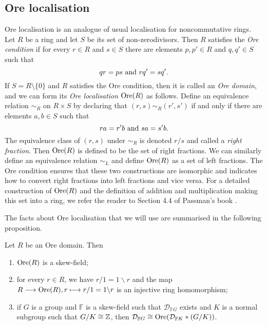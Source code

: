 \documentclass[11pt, letterpaper]{amsart}
\begin{document}
\subsection{Ore localisation}

Ore localisation is an analogue of usual localisation for noncommutative rings. Let $R$ be a ring and let $S$ be its set of non-zerodivisors. Then $R$ satisfies the \textit{Ore condition} if for every $r \in R$ and $s \in S$ there  are elements $p,p' \in R$ and $q,q' \in S$ such that 
\[
    qr = ps \ \textnormal{and} \ rq' = sq'.
\]
If  $S = R \setminus \{0\}$ and $R$ satisfies the Ore condition, then it is called an \textit{Ore domain}, and we can form its \textit{Ore localisation} $\operatorname{Ore}(R)$ as follows. Define an equivalence relation $\sim_R$ on $R \times S$ by declaring that $(r,s) \sim_R (r',s')$ if and only if there are elements $a,b \in S$ such that
\[
    ra = r'b \ \textnormal{and} \ sa = s'b.
\]
The equivalence class of $(r,s)$ under $\sim_R$ is denoted $r/s$ and called a \textit{right fraction}. Then $\operatorname{Ore}(R)$ is defined to be the set of right fractions. We can similarly define an equivalence relation $\sim_L$ and define $\operatorname{Ore}(R)$ as a set of left fractions. The Ore condition ensures that these two constructions are isomorphic and indicates how to convert right fractions into left fractions and vice versa. For a detailed construction of $\operatorname{Ore}(R)$ and the definition of addition and multiplication making this set into a ring, we refer the reader to Section 4.4 of Passman's book \cite{PassmanGrpRng}.

The facts about Ore localisation that we will use are summarised in the following proposition.

\begin{prop}\label{prop:OreLoc}
Let $R$ be an Ore domain. Then
\begin{enumerate}[label = (\arabic*)]
    \item $\operatorname{Ore}(R)$ is a skew-field;
    \item for every $r \in R$, we have $r / 1 = 1 \backslash r$ and the map $R \longrightarrow \operatorname{Ore}(R), r \longmapsto r/1 = 1 \backslash r$ is an injective ring homomorphism;
    \item \cite[Proposition 2.2(2)]{JaikinZapirain2020THEUO} if $G$ is a group and $\mathbb{F}$ is a skew-field such that $\mathcal{D}_{\mathbb{F}G}$ exists and $K$ is a normal subgroup such that $G / K \cong \mathbb{Z}$, then  $\mathcal{D}_{\mathbb{F}G} \cong \operatorname{Ore}(\mathcal{D}_{\mathbb{F}K} * (G/K))$.
\end{enumerate}
\end{prop}
\end{document}
